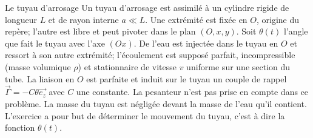 \begin{exo}[PC]{Le tuyau d'arrosage}
Un tuyau d'arrosage est assimilé à un cylindre rigide de longueur $L$ et de rayon interne $a \ll L$. Une extrémité est fixée en $O$, origine du repère; l'autre est libre et peut pivoter dans le plan $(O,x,y)$. Soit $\theta(t)$ l'angle que fait le tuyau avec l'axe $(Ox)$. De l'eau est injectée dans le tuyau en $O$ et ressort à son autre extrémité; l'écoulement est supposé parfait, incompressible (masse volumique $\rho$) et stationnaire de vitesse $v$ uniforme sur une section du tube. La liaison en $O$ est parfaite et induit sur le tuyau un couple de rappel $\Vec{\Gamma} = - C \theta \Vec{e_z}$ avec $C$ une constante. La pesanteur n'est pas prise en compte dans ce problème. La masse du tuyau est négligée devant la masse de l'eau qu'il contient. L'exercice a pour but de déterminer le mouvement du tuyau, c'est à dire la fonction $\theta(t)$.
\begin{center}

\end{center}



\end{exo}
